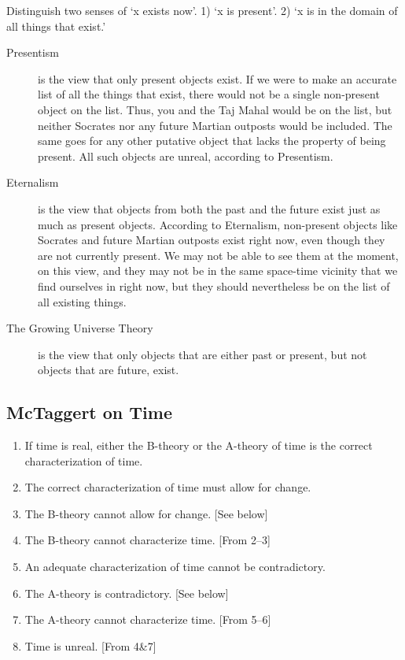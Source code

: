 \documentclass[]{article}
\begin{document}
Distinguish two senses of `x exists now'. 1) `x is present'. 2) `x is in the domain of all things that exist.' 

\begin{description}
\item[Presentism] is the view that only present objects exist. If we were to make an accurate list of all the things that exist, there would not be a single non-present object on the list. Thus, you and the Taj Mahal would be on the list, but neither Socrates nor any future Martian outposts would be included. The same goes for any other putative object that lacks the property of being present. All such objects are unreal, according to Presentism.
\item[Eternalism] is the view that objects from both the past and the future exist just as much as present objects. According to Eternalism, non-present objects like Socrates and future Martian outposts exist right now, even though they are not currently present. We may not be able to see them at the moment, on this view, and they may not be in the same space-time vicinity that we find ourselves in right now, but they should nevertheless be on the list of all existing things.
\item[The Growing Universe Theory] is the view that only objects that are either past or present, but not objects that are future, exist. 
\end{description}




\subsection*{McTaggert on Time}

\begin{enumerate}
\item If time is real, either the B-theory or the A-theory of time is the correct characterization of time. 
\item The correct characterization of time must allow for change. 
\item The B-theory cannot allow for change. [See below]
\item The B-theory cannot characterize time. [From 2--3]
\item An adequate characterization of time cannot be contradictory. 
\item The A-theory is contradictory. [See below]
\item The A-theory cannot characterize time. [From 5--6] 
\item Time is unreal. [From 4\&7]
\end{enumerate}
\end{document}
